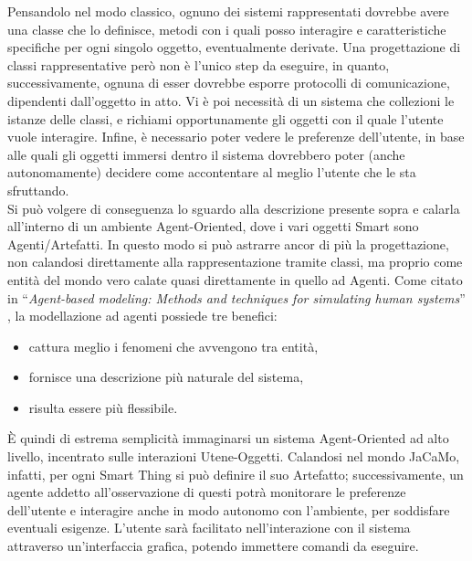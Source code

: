 \documentclass[12pt,a4paper,openright,oneside]{report}
\newcommand{\quotes}[1]{``#1''}
\begin{document}
Pensandolo nel modo classico, ognuno dei sistemi rappresentati dovrebbe avere una classe che lo definisce, metodi con i quali posso interagire e caratteristiche specifiche per ogni singolo oggetto, eventualmente derivate. Una progettazione di classi rappresentative però non è l'unico step da eseguire, in quanto, successivamente, ognuna di esser dovrebbe esporre protocolli di comunicazione, dipendenti dall'oggetto in atto. Vi è poi necessità di un sistema che collezioni le istanze delle classi, e richiami opportunamente gli oggetti con il quale l'utente vuole interagire. Infine, è necessario poter vedere le preferenze dell'utente, in base alle quali gli oggetti immersi dentro il sistema dovrebbero poter (anche autonomamente) decidere come accontentare al meglio l'utente che le sta sfruttando. \\

Si può volgere di conseguenza lo sguardo alla descrizione presente sopra e calarla all'interno di un ambiente Agent-Oriented, dove i vari oggetti Smart sono Agenti/Artefatti. In questo modo si può astrarre ancor di più la progettazione, non calandosi direttamente alla rappresentazione tramite classi, ma proprio come entità del mondo vero calate quasi direttamente in quello ad Agenti. Come citato in \quotes{\textit{Agent-based modeling: Methods and techniques for simulating human systems}} \cite{abm}, la modellazione ad agenti possiede tre benefici:

\begin{itemize}
	\itemsep0em 
	\item cattura meglio i fenomeni che avvengono tra entità,
	\item fornisce una descrizione più naturale del sistema,
	\item risulta essere più flessibile.
\end{itemize}

È quindi di estrema semplicità immaginarsi un sistema Agent-Oriented ad alto livello, incentrato sulle interazioni Utene-Oggetti. Calandosi nel mondo JaCaMo, infatti, per ogni Smart Thing si può definire il suo Artefatto; successivamente, un agente addetto all'osservazione di questi potrà monitorare le preferenze dell'utente e interagire anche in modo autonomo con l'ambiente, per soddisfare eventuali esigenze. L'utente sarà facilitato nell'interazione con il sistema attraverso un'interfaccia grafica, potendo immettere comandi da eseguire.
\end{document}
